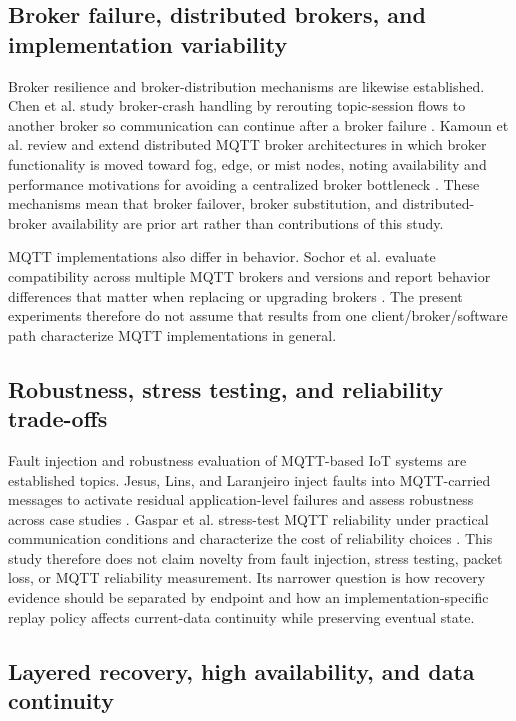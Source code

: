 \documentclass[journal]{IEEEtran}
\begin{document}
\subsection{Broker failure, distributed brokers, and implementation variability}

Broker resilience and broker-distribution mechanisms are likewise established. Chen et al. study broker-crash handling by rerouting topic-session flows to another broker so communication can continue after a broker failure \cite{chen2020}. Kamoun et al. review and extend distributed MQTT broker architectures in which broker functionality is moved toward fog, edge, or mist nodes, noting availability and performance motivations for avoiding a centralized broker bottleneck \cite{kamoun2024}. These mechanisms mean that broker failover, broker substitution, and distributed-broker availability are prior art rather than contributions of this study.

MQTT implementations also differ in behavior. Sochor et al. evaluate compatibility across multiple MQTT brokers and versions and report behavior differences that matter when replacing or upgrading brokers \cite{sochor2021}. The present experiments therefore do not assume that results from one client/broker/software path characterize MQTT implementations in general.

\subsection{Robustness, stress testing, and reliability trade-offs}

Fault injection and robustness evaluation of MQTT-based IoT systems are established topics. Jesus, Lins, and Laranjeiro inject faults into MQTT-carried messages to activate residual application-level failures and assess robustness across case studies \cite{jesus2025}. Gaspar et al. stress-test MQTT reliability under practical communication conditions and characterize the cost of reliability choices \cite{gaspar2026}. This study therefore does not claim novelty from fault injection, stress testing, packet loss, or MQTT reliability measurement. Its narrower question is how recovery evidence should be separated by endpoint and how an implementation-specific replay policy affects current-data continuity while preserving eventual state.

\subsection{Layered recovery, high availability, and data continuity}
\end{document}
